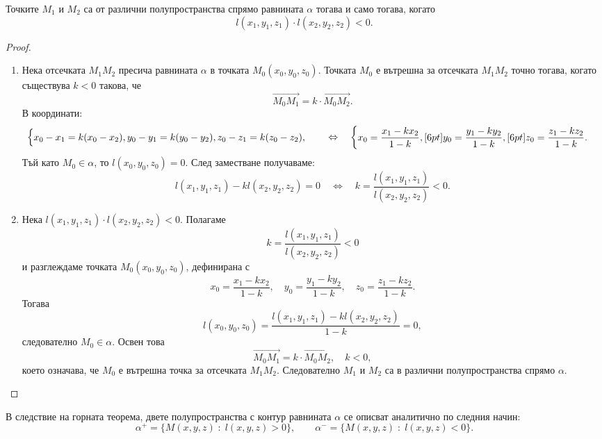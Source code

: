 \documentclass{article}
\renewcommand{\\}{\newline}
\begin{document}
\begin{theorem}
Точките $M_1$ и $M_2$ са от различни полупространства спрямо равнината $\alpha$ тогава и само тогава, когато
\[l(x_1, y_1, z_1) \cdot l(x_2, y_2, z_2) < 0.\]
\end{theorem}

\begin{proof}
\begin{enumerate}
\item[$(\Rightarrow)$] Нека отсечката $M_1M_2$ пресича равнината $\alpha$ в точката $M_0(x_0, y_0, z_0)$. Точката $M_0$ е вътрешна за отсечката $M_1M_2$ точно тогава, когато съществува $k < 0$ такова, че
\[\overrightarrow{M_0M_1} = k \cdot \overrightarrow{M_0M_2}.\]
В координати:
\[
\begin{cases}
x_0 - x_1 = k(x_0 - x_2), \\
y_0 - y_1 = k(y_0 - y_2), \\
z_0 - z_1 = k(z_0 - z_2),
\end{cases}
\quad \Leftrightarrow \quad
\begin{cases}
x_0 = \dfrac{x_1 - kx_2}{1 - k}, \\[6pt]
y_0 = \dfrac{y_1 - ky_2}{1 - k}, \\[6pt]
z_0 = \dfrac{z_1 - kz_2}{1 - k}.
\end{cases}
\]
Тъй като $M_0 \in \alpha$, то $l(x_0, y_0, z_0) = 0$. След заместване получаваме:
\[l(x_1, y_1, z_1) - k l(x_2, y_2, z_2) = 0 \quad \Leftrightarrow \quad k = \frac{l(x_1, y_1, z_1)}{l(x_2, y_2, z_2)} < 0.\]

\item[$(\Leftarrow)$] Нека $l(x_1, y_1, z_1) \cdot l(x_2, y_2, z_2) < 0$. Полагаме
\[k = \frac{l(x_1, y_1, z_1)}{l(x_2, y_2, z_2)} < 0\]
и разглеждаме точката $M_0(x_0, y_0, z_0)$, дефинирана с
\[x_0 = \frac{x_1 - kx_2}{1 - k}, \quad y_0 = \frac{y_1 - ky_2}{1 - k}, \quad z_0 = \frac{z_1 - kz_2}{1 - k}.\]
Тогава
\[l(x_0, y_0, z_0) = \frac{l(x_1, y_1, z_1) - k l(x_2, y_2, z_2)}{1 - k} = 0,\]
следователно $M_0 \in \alpha$. Освен това
\[
\overrightarrow{M_0M_1} = k \cdot \overrightarrow{M_0M_2}, \quad k < 0,
\]
което означава, че $M_0$ е вътрешна точка за отсечката $M_1M_2$. Следователно $M_1$ и $M_2$ са в различни полупространства спрямо $\alpha$.
\end{enumerate}
\end{proof}

В следствие на горната теорема, двете полупространства с контур равнината $\alpha$ се описват аналитично по следния начин:
\[
\alpha^+ = \{M(x, y, z) \;:\; l(x, y, z) > 0\}, \qquad
\alpha^- = \{M(x, y, z) \;:\; l(x, y, z) < 0\}.
\]
\end{document}
